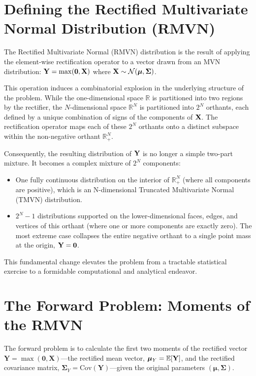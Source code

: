 \section{Defining the Rectified Multivariate Normal Distribution (RMVN)}
\label{sec:define_rmvn}

The Rectified Multivariate Normal (RMVN) distribution is the result of applying the element-wise rectification operator to a vector drawn from an MVN distribution: $\mathbf{Y} = \max(\mathbf{0}, \mathbf{X})$ where $\mathbf{X} \sim \mathcal{N}(\boldsymbol{\mu}, \boldsymbol{\Sigma})$.

This operation induces a combinatorial explosion in the underlying structure of the problem. While the one-dimensional space $\mathbb{R}$ is partitioned into two regions by the rectifier, the $N$-dimensional space $\mathbb{R}^N$ is partitioned into $2^N$ orthants, each defined by a unique combination of signs of the components of $\mathbf{X}$. The rectification operator maps each of these $2^N$ orthants onto a distinct subspace within the non-negative orthant $\mathbb{R}^N_+$.

Consequently, the resulting distribution of $\mathbf{Y}$ is no longer a simple two-part mixture. It becomes a complex mixture of $2^N$ components:
\begin{itemize}
    \item One fully continuous distribution on the interior of $\mathbb{R}^N_+$ (where all components are positive), which is an N-dimensional Truncated Multivariate Normal (TMVN) distribution.
    \item $2^N-1$ distributions supported on the lower-dimensional faces, edges, and vertices of this orthant (where one or more components are exactly zero). The most extreme case collapses the entire negative orthant to a single point mass at the origin, $\mathbf{Y} = \mathbf{0}$.
\end{itemize}
This fundamental change elevates the problem from a tractable statistical exercise to a formidable computational and analytical endeavor.

\section{The Forward Problem: Moments of the RMVN}
\label{sec:forward_problem_rmvn}

The forward problem is to calculate the first two moments of the rectified vector $\mathbf{Y} = \max(\mathbf{0}, \mathbf{X})$—the rectified mean vector, $\boldsymbol{\mu}_Y = \mathbb{E}[\mathbf{Y}]$, and the rectified covariance matrix, $\boldsymbol{\Sigma}_Y = \text{Cov}(\mathbf{Y})$—given the original parameters $(\boldsymbol{\mu}, \boldsymbol{\Sigma})$.

